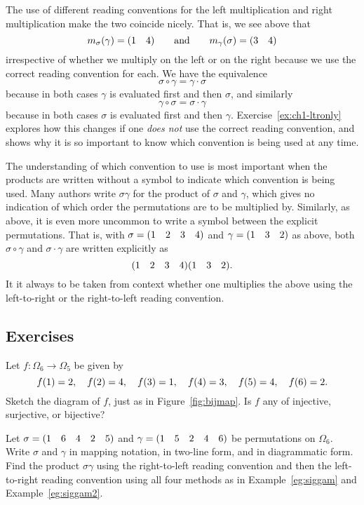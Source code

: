 \begin{example}
     The use of different reading conventions for the left multiplication and right multiplication make the two coincide nicely. That is, we see above that
    \[
    m_{\sigma}(\gamma) = (1 \quad 4) \hspace{20pt}\text{and}\hspace{20pt} m_{\gamma}(\sigma) = (3 \quad 4)
    \]
    irrespective of whether we multiply on the left or on the right because we use the correct reading convention for each. We have the equivalence
    \[
    \sigma \circ \gamma = \gamma \cdot \sigma
    \]
    because in both cases $\gamma$ is evaluated first and then $\sigma$, and similarly
    \[
    \gamma \circ \sigma = \sigma \cdot \gamma
    \]
    because in both cases $\sigma$ is evaluated first and then $\gamma$. Exercise~\ref{ex:ch1-ltronly} explores how this changes if one \textit{does not} use the correct reading convention, and shows why it is so important to know which convention is being used at any time.
\end{example}

The understanding of which convention to use is most important when the products are written without a symbol to indicate which convention is being used. Many authors write $\sigma\gamma$ for the product of $\sigma$ and $\gamma$, which gives no indication of which order the permutations are to be multiplied by. Similarly, as above, it is even more uncommon to write a symbol between the explicit permutations. That is, with $\sigma = (1 \quad 2 \quad 3 \quad 4)$ and $\gamma = (1 \quad 3 \quad 2)$ as above, both $\sigma\circ\gamma$ and $\sigma\cdot\gamma$ are written explicitly as
\[
(1 \quad 2 \quad 3 \quad 4)(1 \quad 3 \quad 2).
\]
It it always to be taken from context whether one multiplies the above using the left-to-right or the right-to-left reading convention.


\subsection{Exercises}

\begin{exercise}\label{ex:ch1-maps}
    Let $f \colon \Omega_{6} \to \Omega_{5}$ be given by
    \[
    f(1) = 2,\quad f(2) = 4,\quad f(3) = 1,\quad f(4) = 3,\quad f(5) = 4,\quad f(6) = 2.
    \]
    Sketch the diagram of $f$, just as in Figure~\ref{fig:bijmap}. Is $f$ any of injective, surjective, or bijective?
\end{exercise}

\begin{exercise}\label{ex:ch1-fourmethods}
    Let $\sigma = (1 \quad 6 \quad 4 \quad 2 \quad 5)$ and $\gamma = (1 \quad 5 \quad 2 \quad 4 \quad 6)$ be permutations on $\Omega_{6}$. Write $\sigma$ and $\gamma$ in mapping notation, in two-line form, and in diagrammatic form. Find the product $\sigma\gamma$ using the right-to-left reading convention and then the left-to-right reading convention using all four methods as in Example~\ref{eg:siggam} and Example~\ref{eg:siggam2}.
\end{exercise}


